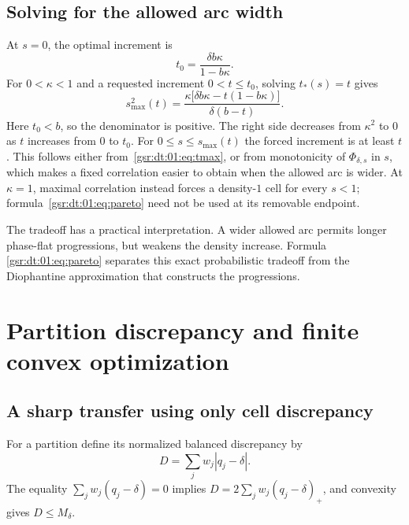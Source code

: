 \documentclass[11pt,letterpaper]{article}
\numberwithin{equation}{section}
\theoremstyle{definition}
\theoremstyle{remark}
\newcommand{\1}{\mathbf 1}
\newcommand{\ph}{\Phi_{\delta,s}}
\newcommand{\srctag}[1]{\texorpdfstring{\enspace\textup{[#1]}}{ [#1]}}
\newcommand{\srcnote}[2]{\par\noindent{\small\textit{Source #1, delivered #2.}}\par}
\begin{document}
\subsection{Solving for the allowed arc width}
At $s=0$, the optimal increment is
\[
 t_0=\frac{\delta b\kappa}{1-b\kappa}.
\]
For $0<\kappa<1$ and a requested increment $0<t\le t_0$, solving
$t_*(s)=t$ gives
\begin{equation}\label{gsr:dt:01:eq:pareto}
 s_{\max}^2(t)=
 \frac{\kappa\bigl[\delta b\kappa-t(1-b\kappa)\bigr]}
      {\delta(b-t)}.
\end{equation}
Here $t_0<b$, so the denominator is positive. The right side decreases
from $\kappa^2$ to $0$ as $t$ increases from $0$ to $t_0$.
For $0\le s\le s_{\max}(t)$ the forced increment is at least $t$.
This follows either from~\eqref{gsr:dt:01:eq:tmax}, or from monotonicity of
$\ph$ in $s$, which makes a fixed correlation easier to obtain when
the allowed arc is wider. At $\kappa=1$, maximal correlation instead
forces a density-$1$ cell for every $s<1$; formula~\eqref{gsr:dt:01:eq:pareto}
need not be used at its removable endpoint.

The tradeoff has a practical interpretation. A wider allowed arc permits
longer phase-flat progressions, but weakens the density increase. Formula
\eqref{gsr:dt:01:eq:pareto} separates this exact probabilistic tradeoff from the
Diophantine approximation that constructs the progressions.

\section[{Partition discrepancy and finite convex optimization\srctag{01}}]{Partition discrepancy and finite convex optimization}\label{gsr:dt:01:sec:d5}\label{gsr:dt:01:sec:lp}
\srcnote{01}{Section 5}

\subsection{A sharp transfer using only cell discrepancy}
For a partition define its normalized balanced discrepancy by
\begin{equation}\label{gsr:dt:01:eq:discrepancy}
 D=\sum_jw_j|q_j-\delta|.
\end{equation}
The equality $\sum_jw_j(q_j-\delta)=0$ implies
$D=2\sum_jw_j(q_j-\delta)_+$, and convexity gives $D\le M_\delta$.
\end{document}
